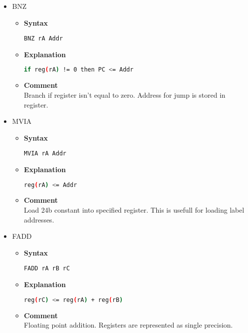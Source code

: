 \begin{itemize}
    \item BNZ
    \begin{itemize}
        \item \textbf{Syntax}
        \begin{lstlisting}[language={[markII]Assembler}, frame=single]
    BNZ rA Addr
        \end{lstlisting}
        \item \textbf{Explanation}
        \begin{lstlisting}[language=bash, frame=single]
    if reg(rA) != 0 then PC <= Addr
        \end{lstlisting}
        \item \textbf{Comment} \\
    Branch if register isn't equal to zero. Address for jump is stored in register.
    \end{itemize}

    \item MVIA
    \begin{itemize}
        \item \textbf{Syntax}
        \begin{lstlisting}[language={[markII]Assembler}, frame=single]
    MVIA rA Addr
        \end{lstlisting}
        \item \textbf{Explanation}
        \begin{lstlisting}[language=bash, frame=single]
    reg(rA) <= Addr
        \end{lstlisting}
        \item \textbf{Comment} \\
    Load 24b constant into specified register. This is usefull for loading label addresses.
    \end{itemize}

    \item FADD
    \begin{itemize}
        \item \textbf{Syntax}
        \begin{lstlisting}[language={[markII]Assembler}, frame=single]
    FADD rA rB rC
        \end{lstlisting}
        \item \textbf{Explanation}
        \begin{lstlisting}[language=bash, frame=single]
    reg(rC) <= reg(rA) + reg(rB)
        \end{lstlisting}
        \item \textbf{Comment} \\
        Floating point addition. Registers are represented as single precision.
    \end{itemize}


\end{itemize}
